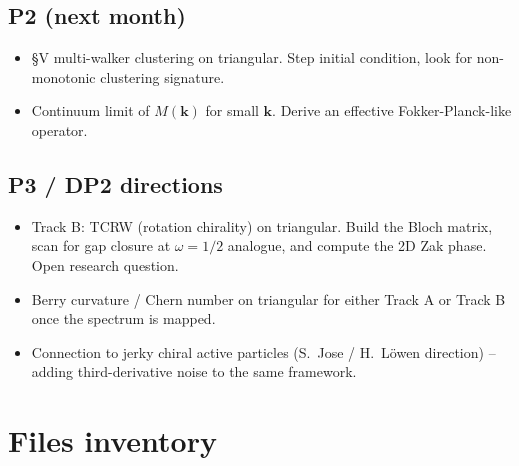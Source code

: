 \documentclass[11pt,a4paper]{article}
\newcommand{\vk}{\mathbf{k}}
\begin{document}
\subsection*{P2 (next month)}
\begin{itemize}[leftmargin=*,nosep]
\item §V multi-walker clustering on triangular. Step initial condition,
  look for non-monotonic clustering signature.
\item Continuum limit of $M(\vk)$ for small $\vk$. Derive an effective
  Fokker-Planck-like operator.
\end{itemize}

\subsection*{P3 / DP2 directions}
\begin{itemize}[leftmargin=*,nosep]
\item Track B: TCRW (rotation chirality) on triangular. Build the
  Bloch matrix, scan for gap closure at $\omega = 1/2$ analogue, and
  compute the 2D Zak phase. Open research question.
\item Berry curvature / Chern number on triangular for either Track A
  or Track B once the spectrum is mapped.
\item Connection to jerky chiral active particles (S.~Jose / H.~Löwen
  direction) -- adding third-derivative noise to the same framework.
\end{itemize}

\section{Files inventory}\label{sec:inventory}
\end{document}
